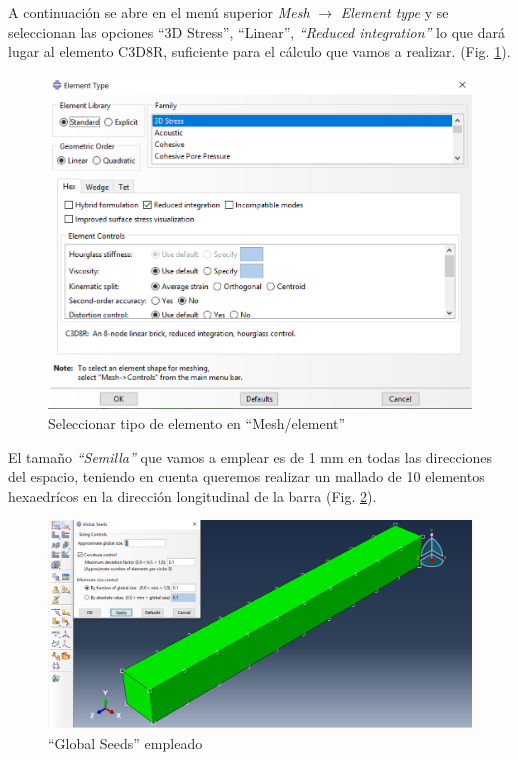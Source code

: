 \documentclass[spanish,a4paper,12pt]{article}
\begin{document}
A continuación se abre en el menú superior \emph{Mesh} $\to$ \emph{Element type} y se seleccionan las opciones ``3D Stress'', ``Linear'', \emph{``Reduced integration''} lo que dará lugar al elemento C3D8R, suficiente para el cálculo que vamos a realizar. 
(Fig. \ref{fig:mesh-element}).
\begin{figure}[h!tp]
\centering
\includegraphics[scale=0.4]{capturas/31-mesh.png}
\caption{Seleccionar tipo de elemento en ``Mesh/element''}
\label{fig:mesh-element}%
\end{figure}

El tamaño \emph{``Semilla''} que vamos a emplear es de 1 mm en todas las direcciones del espacio, teniendo en cuenta queremos realizar un mallado de 10 elementos hexaedrícos en la dirección longitudinal de la barra (Fig. \ref{fig:mesh1}).

\clearpage
\begin{figure}[h!tp]
\centering
\includegraphics[scale=0.4]{capturas/mesh1.png}
\caption{``Global Seeds'' empleado}
\label{fig:mesh1}%
\end{figure}
\end{document}
